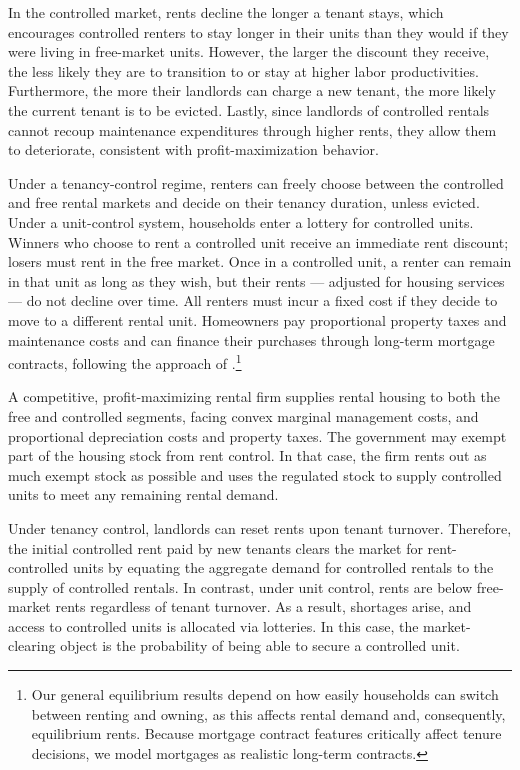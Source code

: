 \documentclass[parskip=full]{article}
\begin{document}
In the controlled market, rents decline the longer a tenant stays, which encourages controlled renters to stay longer in their units than they would if they were living in free-market units. However, the larger the discount they receive, the less likely they are to transition to or stay at higher labor productivities. Furthermore, the more their landlords can charge a new tenant, the more likely the current tenant is to be evicted. Lastly, since landlords of controlled rentals cannot recoup maintenance expenditures through higher rents, they allow them to deteriorate, consistent with profit-maximization behavior.

Under a tenancy-control regime, renters can freely choose between the controlled and free rental markets and decide on their tenancy duration, unless evicted. Under a unit-control system, households enter a lottery for controlled units. Winners who choose to rent a controlled unit receive an immediate rent discount; losers must rent in the free market. Once in a controlled unit, a renter can remain in that unit as long as they wish, but their rents — adjusted for housing services — do not decline over time. All renters must incur a fixed cost if they decide to move to a different rental unit. Homeowners pay proportional property taxes and maintenance costs and can finance their purchases through long-term mortgage contracts, following the approach of \citet{kkk-2021}.\footnote{Our general equilibrium results depend on how easily households can switch between renting and owning, as this affects rental demand and, consequently, equilibrium rents. Because mortgage contract features critically affect tenure decisions, we model mortgages as realistic long-term contracts.} 

A competitive, profit-maximizing rental firm supplies rental housing to both the free and controlled segments, facing convex marginal management costs, and proportional depreciation costs and property taxes. The government may exempt part of the housing stock from rent control. In that case, the firm rents out as much exempt stock as possible and uses the regulated stock to supply controlled units to meet any remaining rental demand.

Under tenancy control, landlords can reset rents upon tenant turnover. Therefore, the initial controlled rent paid by new tenants clears the market for rent-controlled units by equating the aggregate demand for controlled rentals to the supply of controlled rentals. In contrast, under unit control, rents are below free-market rents regardless of tenant turnover. As a result, shortages arise, and access to controlled units is allocated via lotteries. In this case, the market-clearing object is the probability of being able to secure a controlled unit.
\end{document}
